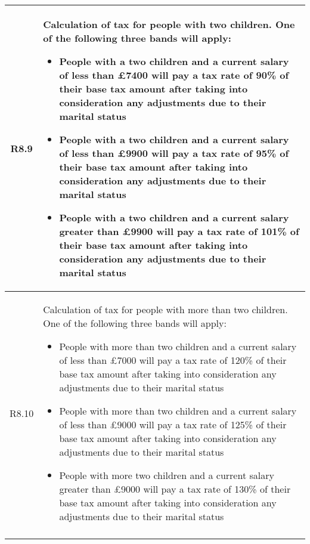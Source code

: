 \begin{table}[H]
\small
\centering
\begin{tabularx}{\textwidth}{| c | X |}
    \hline %
    \label{req:r8-9}
    R8.9 & Calculation of tax for people with two children. One of the following three bands will apply:
    \begin{itemize}[itemsep=\tableitemsep, leftmargin=\tableleftsep]
        \item People with a two children and a current salary of less than £7400 will pay a tax rate of 90\% of their base tax amount after taking into consideration any adjustments due to their marital status
        \item People with a two children and a current salary of less than £9900 will pay a tax rate of 95\% of their base tax amount after taking into consideration any adjustments due to their marital status
        \item People with a two children and a current salary greater than £9900 will pay a tax rate of 101\% of their base tax amount after taking into consideration any adjustments due to their marital status
    \end{itemize}
    \\
    \hline %
    \label{req:r8-10}
    R8.10 & Calculation of tax for people with more than two children. One of the following three bands will apply:
    \begin{itemize}[itemsep=\tableitemsep, leftmargin=\tableleftsep]
        \item People with more than two children and a current salary of less than £7000 will pay a tax rate of 120\% of their base tax amount after taking into consideration any adjustments due to their marital status
        \item People with more than two children and a current salary of less than £9000 will pay a tax rate of 125\% of their base tax amount after taking into consideration any adjustments due to their marital status
        \item People with more two children and a current salary greater than £9000 will pay a tax rate of 130\% of their base tax amount after taking into consideration any adjustments due to their marital status
    \end{itemize}
    \\
    \hline %
    \label{req:r8-11}

\end{tabularx}
\end{table}
